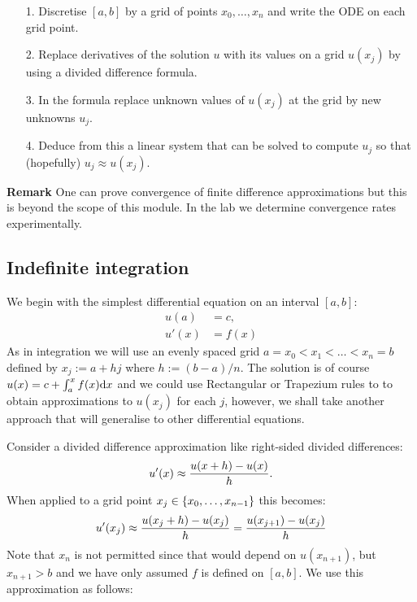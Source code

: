 \begin{itemize}
\item[1. ] Discretise $[a,b]$ by a grid of points $x_0,\ensuremath{\ldots},x_n$ and write the ODE on each grid point.


\item[2. ] Replace derivatives of the solution $u$ with its values on a grid $u(x_j)$ by using a divided difference formula.


\item[3. ] In the formula replace unknown values of $u(x_j)$ at the grid by new unknowns $u_j$.


\item[4. ] Deduce from this  a linear system that can be solved to compute $u_j$ so that (hopefully) $u_j \ensuremath{\approx} u(x_j)$. 

\end{itemize}
\textbf{Remark} One can prove convergence of finite difference approximations but this is beyond the scope of this module. In the lab we determine convergence rates experimentally.

\subsection{Indefinite integration}
We begin with the simplest differential equation on an interval $[a,b]$:
\begin{align*}
u(a) &= c, \\
u'(x) &= f(x)
\end{align*}
As in integration we will use an evenly spaced grid $a = x_0 < x_1 < \ensuremath{\ldots} < x_n = b$ defined by $x_j :=  a + h j$ where $h := (b-a)/n$. The solution is of course $u(x) = c + \ensuremath{\int}_a^x f(x) {\rm d}x$ and we could use Rectangular or Trapezium rules to to obtain approximations to $u(x_j)$ for each $j$, however, we shall take another approach that will generalise to other differential equations. 

Consider a divided difference approximation like right-sided divided differences: 
\[
u'(x) \ensuremath{\approx} {u(x+h) - u(x)\over h}.
\]
When applied to a grid point $x_j \in \left\{{x_0,\ldots,x_{n-1}}\right\}$ this becomes:
\[
u'(x_j) \ensuremath{\approx} {u(x_j+h) - u(x_j)\over h} = {u(x_{j+1}) - u(x_j)\over h}
\]
Note that $x_n$ is not permitted since that would depend on $u(x_{n+1})$, but $x_{n+1} > b$ and we have only assumed $f$ is defined on $[a,b]$. We use this approximation as follows:

